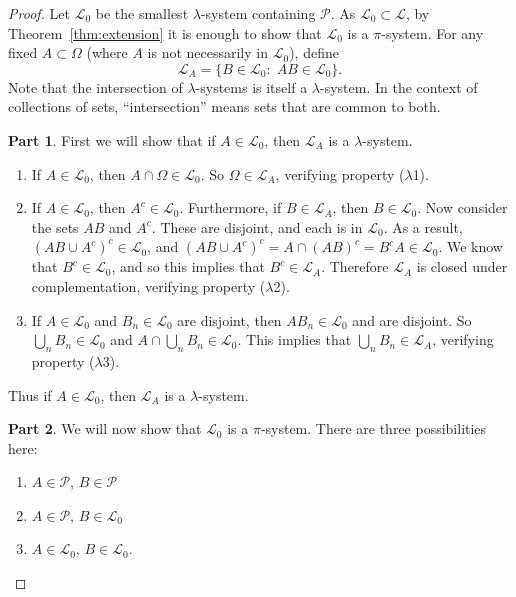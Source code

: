 \documentclass[11pt,fleqn]{book} %
\begin{document}
\begin{proof}
	Let $\mathcal{L}_0$ be the smallest $\lambda$-system containing $\mathcal{P}$. As $\mathcal{L}_0 \subset \mathcal{L}$, by Theorem~\ref{thm:extension} it is enough to show that $\mathcal{L}_0$ is a $\pi$-system. For any fixed $A \subset \Omega$ (where $A$ is not necessarily in $\mathcal{L}_0$), define
	\[
		\mathcal{L}_A = \{B \in \mathcal{L}_0:\;AB \in \mathcal{L}_0\}.
	\]
	Note that the intersection of $\lambda$-systems is itself a $\lambda$-system. In the context of collections of sets, ``intersection'' means sets that are common to both.

	\vspace{10pt}
	\textbf{Part 1}. First we will show that if $A \in \mathcal{L}_0$, then $\mathcal{L}_A$ is a $\lambda$-system.

	\begin{enumerate}
		\item If $A \in \mathcal{L}_0$, then $A \cap \Omega \in \mathcal{L}_0$. So $\Omega \in \mathcal{L}_A$, verifying property ($\lambda$1).
		\item If $A \in \mathcal{L}_0$, then $A^c \in \mathcal{L}_0$. Furthermore, if $B \in \mathcal{L}_A$, then $B \in \mathcal{L}_0$. Now consider the sets $AB$ and $A^c$. These are disjoint, and each is in $\mathcal{L}_0$. As a result, $(AB \cup A^c)^c \in \mathcal{L}_0$, and $(AB \cup A^c)^c = A \cap (AB)^c = B^cA \in \mathcal{L}_0$. We know that $B^c \in \mathcal{L}_0$, and so this implies that $B^c \in \mathcal{L}_A$. Therefore $\mathcal{L}_A$ is closed under complementation, verifying property ($\lambda$2).
		\item If $A \in \mathcal{L}_0$ and $B_n \in \mathcal{L}_0$ are disjoint, then $AB_n \in \mathcal{L}_0$ and are disjoint. So $\bigcup_n B_n \in \mathcal{L}_0$ and $A \cap \bigcup_n B_n \in \mathcal{L}_0$. This implies that $\bigcup_n B_n \in \mathcal{L}_A$, verifying property ($\lambda$3).
	\end{enumerate}

	Thus if $A \in \mathcal{L}_0$, then $\mathcal{L}_A$ is a $\lambda$-system.

	\vspace{10pt}
	\textbf{Part 2}. We will now show that $\mathcal{L}_0$ is a $\pi$-system. There are three possibilities here:

	\begin{enumerate}
		\item $A \in \mathcal{P}$, $B \in \mathcal{P}$
		\item $A \in \mathcal{P}$, $B \in \mathcal{L}_0$
		\item $A \in \mathcal{L}_0$, $B \in \mathcal{L}_0$.
	\end{enumerate}


\end{proof}
\end{document}
